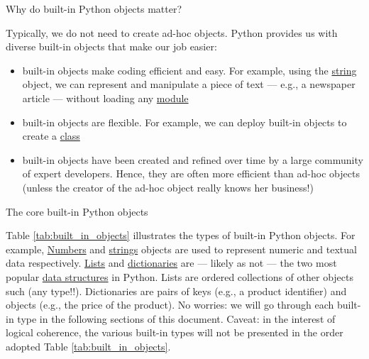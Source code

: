 \documentclass[a4paper,11pt]{book}
\numberwithin{figure}{chapter}
\numberwithin{table}{chapter}
\newcommand{\question}[1]{%
    \begin{tcolorbox}[colback=comp_c!10,colframe=comp_c,sidebyside align=top,width=\linewidth,before skip=1ex]
        #1
    \end{tcolorbox}%
    \switchcolumn%
}
\newcommand{\note}[1]{%
    \begin{tcolorbox}[colback=white!0,colframe=white!10,width=\linewidth,before skip=1ex]
        #1
    \end{tcolorbox}         
}
\begin{document}
\begin{paracol}{2}
    \question{\raggedright Why do built-in Python objects matter?} 
    \note{
    Typically, we do not need to create ad-hoc objects. Python provides us with diverse built-in objects that make our job easier:
    \begin{itemize}
    	\item built-in objects make coding efficient and easy. For example, using the \href{https://docs.python.org/3/tutorial/introduction.html#strings}{string} object, we can represent and manipulate a piece of text --- e.g., a newspaper article --- without loading any \href{https://docs.python.org/3/tutorial/modules.html}{module}
    	\item built-in objects are flexible. For example, we can deploy built-in objects to create a \href{https://docs.python.org/3/tutorial/classes.html}{class}
    	\item built-in objects have been created and refined over time by a large community of expert developers. Hence, they are  often  more  efficient  than  ad-hoc objects (unless the creator of the ad-hoc object really knows her business!)
    \end{itemize}}
\end{paracol}
\clearpage

\begin{paracol}{2}
    \question{\raggedright The core built-in Python objects} 
	\note{Table \ref{tab:built_in_objects} illustrates the types of built-in Python objects. For example, \href{https://docs.python.org/3/tutorial/introduction.html#numbers}{Numbers} and \href{https://docs.python.org/3/tutorial/introduction.html#strings}{strings} objects are used to represent numeric and textual data respectively. \href{https://docs.python.org/3/tutorial/introduction.html#lists}{Lists} and \href{https://docs.python.org/3/tutorial/datastructures.html#dictionaries}{dictionaries} are --- likely as not --- the two most popular \href{https://docs.python.org/3/tutorial/datastructures.html}{data structures} in Python. Lists are ordered collections of other objects such (any type!!). Dictionaries are pairs of keys (e.g., a product identifier) and objects (e.g., the price of the product). No worries: we will go through each built-in type in the following sections of this document. Caveat: in the interest of logical coherence, the various built-in types will not be presented in the order adopted Table \ref{tab:built_in_objects}.} 
\end{paracol}
\end{document}
